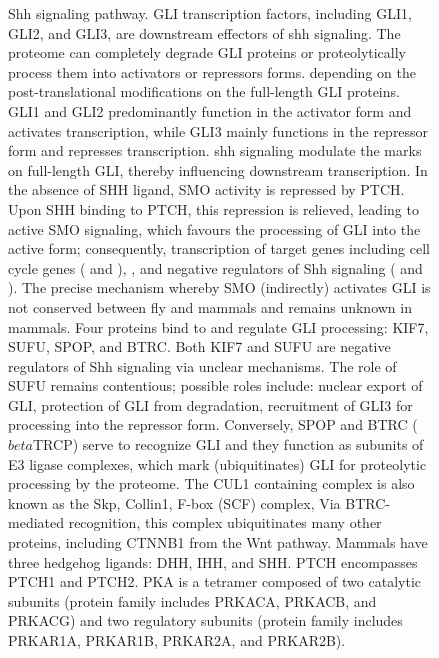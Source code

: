 \begin{figure}[H]
	\begin{center}
	\end{center}
	\caption[\gls{shh} signaling pathway]
	{
		Shh signaling pathway.
		GLI transcription factors, including GLI1, GLI2, and GLI3, are downstream effectors of \gls{shh} signaling. The proteome can completely degrade GLI proteins or proteolytically process them into activators or repressors forms. depending on the post-translational modifications on the full-length GLI proteins. GLI1 and GLI2 predominantly function in the activator form and activates transcription, while GLI3 mainly functions in the repressor form and represses transcription. \gls{shh} signaling modulate the marks on full-length GLI, thereby influencing downstream transcription.
		In the absence of SHH ligand, SMO activity is repressed by PTCH. Upon SHH binding to PTCH, this repression is relieved, leading to active SMO signaling, which favours the processing of GLI into the active form; consequently, transcription of target genes including cell cycle genes ( and ), , and negative regulators of Shh signaling ( and ).
		The precise mechanism whereby SMO (indirectly) activates GLI is not conserved between fly and mammals and remains unknown in mammals. Four proteins bind to and regulate GLI processing: KIF7, SUFU, SPOP, and BTRC. Both KIF7 and SUFU are negative regulators of Shh signaling via unclear mechanisms. The role of SUFU remains contentious; possible roles include: nuclear export of GLI, protection of GLI from degradation, recruitment of GLI3 for processing into the repressor form. Conversely, SPOP and BTRC ($beta$TRCP) serve to recognize GLI and they function as subunits of E3 ligase complexes, which mark (ubiquitinates) GLI for proteolytic processing by the proteome. The CUL1 containing complex is also known as the Skp, Collin1, F-box (SCF) complex, Via BTRC-mediated recognition, this complex ubiquitinates many other proteins, including CTNNB1 from the Wnt pathway.
		Mammals have three hedgehog ligands: DHH, IHH, and SHH. PTCH encompasses PTCH1 and PTCH2. PKA is a tetramer composed of two catalytic subunits (protein family includes PRKACA, PRKACB, and PRKACG) and two regulatory subunits (protein family includes PRKAR1A, PRKAR1B, PRKAR2A, and PRKAR2B).
	}
	\label{fig:shh-pathway}
\end{figure}

